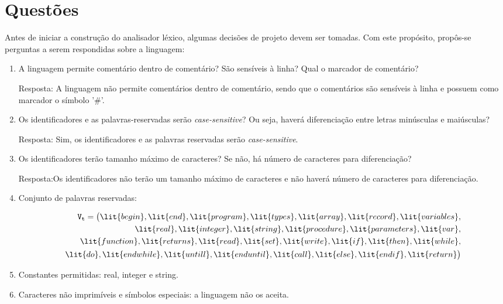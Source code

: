 \documentclass[a4paper,12pt]{article}
\begin{document}
\section{Questões}
	Antes de iniciar a construção do analisador léxico, algumas decisões de projeto devem ser tomadas. Com este propósito, propôs-se perguntas a serem respondidas sobre a linguagem:
    \begin{enumerate}
      \item A linguagem permite comentário dentro de comentário? São sensíveis à linha? Qual o marcador de comentário?
      	
        Resposta: A linguagem não permite comentários dentro de comentário, sendo que o comentários são sensíveis à linha e possuem como marcador o símbolo '\#'. 
        
      \item Os identificadores e as palavras-reservadas serão \textit{case-sensitive}? Ou seja, haverá diferenciação entre letras minúsculas e maiúsculas?
      
      Resposta: Sim, os identificadores e as palavras reservadas serão \textit{case-sensitive}.
      
      \item Os identificadores terão tamanho máximo de caracteres? Se não, há número de caracteres para diferenciação? 
      
      Resposta:Os identificadores não terão um tamanho máximo de caracteres e não haverá número de caracteres para diferenciação.
      
      \item Conjunto de palavras reservadas:
      
            \begin{symbols}
        \begin{align*}\
          \mathtt{V_t} = \big(\lit{begin}, \lit{end}, \lit{program}, \lit{types}, \lit{array}, \lit{record},
          \lit{variables},\\ \lit{real}, \lit{integer}, \lit{string}, \lit{procedure},
          \lit{parameters}, \lit{var}, \\\lit{function}, \lit{returns}, \lit{read}, \lit{set}, \lit{write}, \lit{if}, 					\lit{then},
          \lit{while},\\ \lit{do}, \lit{endwhile}, \lit{untill}, \lit{enduntil}, \lit{call}, \lit{else},
        \lit{endif}, \lit{return}\big)
      \end{align*}
      \end{symbols}
      
      \item  Constantes permitidas: real, integer e string.
      
      \item Caracteres não imprimíveis e símbolos especiais: a linguagem não os aceita.
    \end{enumerate}
\end{document}
